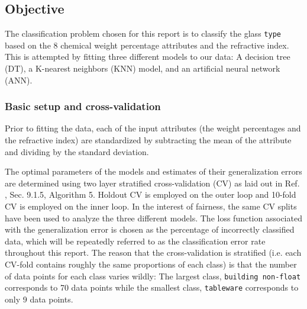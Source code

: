 \subsection{Objective}

The classification problem chosen for this report is to classify the glass \texttt{type} based on the 8 chemical weight percentage attributes and the refractive index. This is attempted by fitting three different models to our data: A decision tree (DT), a K-nearest neighbors (KNN) model, and an artificial neural network (ANN). 

\subsubsection{Basic setup and cross-validation}\label{sec:cross_validation_jutification}

Prior to fitting the data, each of the input attributes (the weight percentages and the refractive index) are standardized by subtracting the mean of the attribute and dividing by the standard deviation.

The optimal parameters of the models and estimates of their generalization errors are determined using two layer stratified cross-validation (CV) as laid out in Ref. \cite{coursenotes}, Sec. 9.1.5, Algorithm 5. Holdout CV is employed on the outer loop and 10-fold CV is employed on the inner loop. In the interest of fairness, the same CV splits have been used to analyze the three different models. The loss function associated with the generalization error is chosen as the percentage of incorrectly classified data, which will be repeatedly referred to as the classification error rate throughout this report. The reason that the cross-validation is stratified (i.e. each CV-fold contains roughly the same proportions of each class) is that the number of data points for each class varies wildly: The largest class, \texttt{building non-float} corresponds to 70 data points while the smallest class, \texttt{tableware} corresponds to only 9 data points.